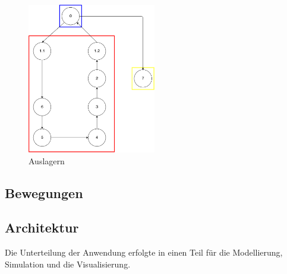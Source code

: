 \begin{figure}[h]
  \begin{center}
    \includegraphics[width=0.5\textwidth]{images/auslagern.png}
    \caption{Auslagern}
    \label{fig:out}
  \end{center}
\end{figure}
%
\subsection{Bewegungen}


\subsection{Architektur}
Die Unterteilung der Anwendung erfolgte in einen Teil für die Modellierung, Simulation und die Visualisierung.  

